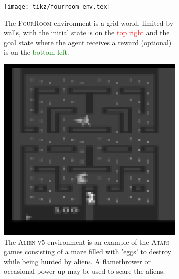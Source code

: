 \documentclass[10pt]{article} %
\begin{document}
\begin{figure}
  \centering
  \begin{subfigure}[b]{0.32\textwidth}
    \centering
    \texttt{[image: tikz/fourroom-env.tex]}
    \caption{The \textsc{FourRoom} environment is a grid world, limited by walls, with the initial state is on the \textcolor{red}{top right} and the goal state where the agent receives a reward (optional) is on the \textcolor{green}{bottom left}.}
    \label{fig:sample-env-fourroom}
  \end{subfigure}
  \hfill
  \begin{subfigure}[b]{0.32\textwidth}
    \centering
    \includegraphics[width=\textwidth]{figures/atari.png}
    \caption{The \textsc{Alien-v5} environment is an example of the \textsc{Atari} games consisting of a maze filled with 'eggs' to destroy while being hunted by aliens. A flamethrower or occasional power-up may be used to scare the aliens.}
    \label{fig:sample-env-atari}
  \end{subfigure}
  \hfill
  \begin{subfigure}[b]{0.32\textwidth}
    \centering

\end{subfigure}
\end{figure}
\end{document}
